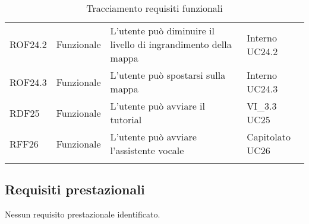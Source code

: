 \begin{longtable}{p{2cm}!{\VRule[1pt]}p{2cm}!{\VRule[1pt]}p{5cm}!{\VRule[1pt]}p{1.5cm}}
 \\
ROF24.2&Funzionale\newline  & L'utente può diminuire il livello di ingrandimento della mappa & Interno \newline UC24.2
 \\
ROF24.3&Funzionale\newline  & L'utente può spostarsi sulla mappa & Interno \newline UC24.3
 \\
RDF25&Funzionale\newline  & L'utente può avviare il tutorial & VI_3.3 \newline UC25
\\
RFF26&Funzionale\newline  & L'utente può avviare l'assistente vocale & Capitolato \newline UC26
\\

\caption{Tracciamento requisiti funzionali}
\end{longtable}
\subsection{Requisiti prestazionali}
Nessun requisito prestazionale identificato.
